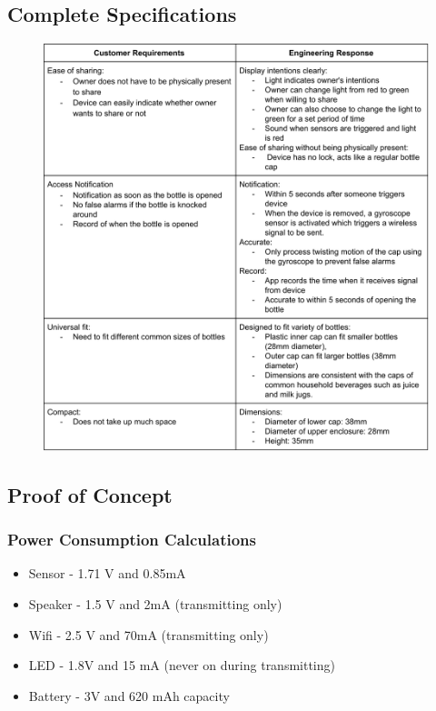 \documentclass[12pt]{article}
\begin{document}
		\subsection*{Complete Specifications}

		
		\begin{figure}[H]
		\centering
		\includegraphics[width=\textwidth]{specs.png}
		\end{figure}
		\setlength{\parindent}{0pt}
		\subsection*{Proof of Concept}
		\subsubsection*{Power Consumption Calculations}
		\begin{itemize}
			\item Sensor - 1.71 V and 0.85mA
			\item Speaker - 1.5 V and 2mA (transmitting only)
			\item Wifi - 2.5 V and 70mA (transmitting only)
			\item LED - 1.8V and 15 mA (never on during transmitting)
			\item Battery - 3V and 620 mAh capacity
		\end{itemize}
\end{document}
